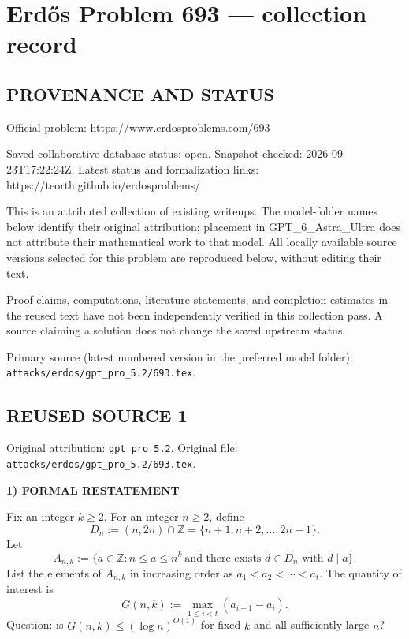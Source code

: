 \section*{Erd\H{o}s Problem 693 --- collection record}

\subsection*{PROVENANCE AND STATUS}
Official problem: https://www.erdosproblems.com/693

Saved collaborative-database status: open.
Snapshot checked: 2026-09-23T17:22:24Z.
Latest status and formalization links: https://teorth.github.io/erdosproblems/

This is an attributed collection of existing writeups. The model-folder names below identify their original attribution; placement in GPT\_6\_Astra\_Ultra does not attribute their mathematical work to that model. All locally available source versions selected for this problem are reproduced below, without editing their text.

Proof claims, computations, literature statements, and completion estimates in the reused text have not been independently verified in this collection pass. A source claiming a solution does not change the saved upstream status.

Primary source (latest numbered version in the preferred model folder): \texttt{attacks/erdos/gpt\_pro\_5.2/693.tex}.

\subsection*{REUSED SOURCE 1}
Original attribution: \texttt{gpt\_pro\_5.2}.
Original file: \texttt{attacks/erdos/gpt\_pro\_5.2/693.tex}.


\noindent\textbf{1) FORMAL RESTATEMENT}

Fix an integer $k\ge 2$. For an integer $n\ge 2$, define
\[
D_n := (n,2n)\cap\mathbb{Z} = \{n+1,n+2,\dots,2n-1\}.
\]
Let
\[
A_{n,k}:=\{a\in\mathbb{Z}: n\le a\le n^k\ \text{and there exists }d\in D_n\text{ with }d\mid a\}.
\]
List the elements of $A_{n,k}$ in increasing order as $a_1<a_2<\cdots<a_t$. The quantity of interest is
\[
G(n,k):=\max_{1\le i<t}(a_{i+1}-a_i).
\]
Question: is $G(n,k)\le (\log n)^{O(1)}$ for fixed $k$ and all sufficiently large $n$?

